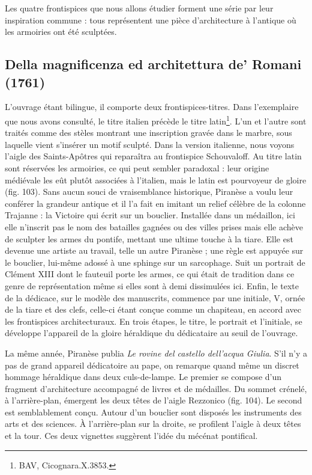 \documentclass[12pt,twoside,openany]{book}
\begin{document}
Les quatre frontispices que nous allons étudier forment une série par leur inspiration commune : tous représentent une pièce d’architecture à l’antique où les armoiries ont été sculptées.

\subsection{Della magnificenza ed architettura de’ Romani (1761)}

L’ouvrage étant bilingue, il comporte deux frontispices-titres. Dans l’exemplaire que nous avons consulté, le titre italien précède le titre latin\footnote{BAV, Cicognara.X.3853.}. L’un et l’autre sont traités comme des stèles montrant une inscription gravée dans le marbre, sous laquelle vient s’insérer un motif sculpté. Dans la version italienne, nous voyons l’aigle des Saints-Apôtres qui reparaîtra au frontispice Schouvaloff. Au titre latin sont réservées les armoiries, ce qui peut sembler paradoxal : leur origine médiévale les eût plutôt associées à l’italien, mais le latin est pourvoyeur de gloire (fig. 103). Sans aucun souci de vraisemblance historique, Piranèse a voulu leur conférer la grandeur antique et il l’a fait en imitant un relief célèbre de la colonne Trajanne : la Victoire qui écrit sur un bouclier. Installée dans un médaillon, ici elle n’inscrit pas le nom des batailles gagnées ou des villes prises mais elle achève de sculpter les armes du pontife, mettant une ultime touche à la tiare. Elle est devenue une artiste au travail, telle un autre Piranèse ; une règle est appuyée sur le bouclier, lui-même adossé à une sphinge sur un sarcophage. Suit un portrait de Clément XIII dont le fauteuil porte les armes, ce qui était de tradition dans ce genre de représentation même si elles sont à demi dissimulées ici. Enfin, le texte de la dédicace, sur le modèle des manuscrits, commence par une initiale, V, ornée de la tiare et des clefs, celle-ci étant conçue comme un chapiteau, en accord avec les frontispices architecturaux. En trois étapes, le titre, le portrait et l’initiale, se développe l’appareil de la gloire héraldique du dédicataire au seuil de l’ouvrage.

La même année, Piranèse publia \textit{Le rovine del castello dell’acqua Giulia}. S’il n’y a pas de grand appareil dédicatoire au pape, on remarque quand même un discret hommage héraldique dans deux culs-de-lampe. Le premier se compose d’un fragment d’architecture accompagné de livres et de médailles. Du sommet crénelé, à l’arrière-plan, émergent les deux têtes de l’aigle Rezzonico (fig. 104). Le second est semblablement conçu. Autour d’un bouclier sont disposés les instruments des arts et des sciences. À l’arrière-plan sur la droite, se profilent l’aigle à deux têtes et la tour. Ces deux vignettes suggèrent l’idée du mécénat pontifical.
\end{document}
